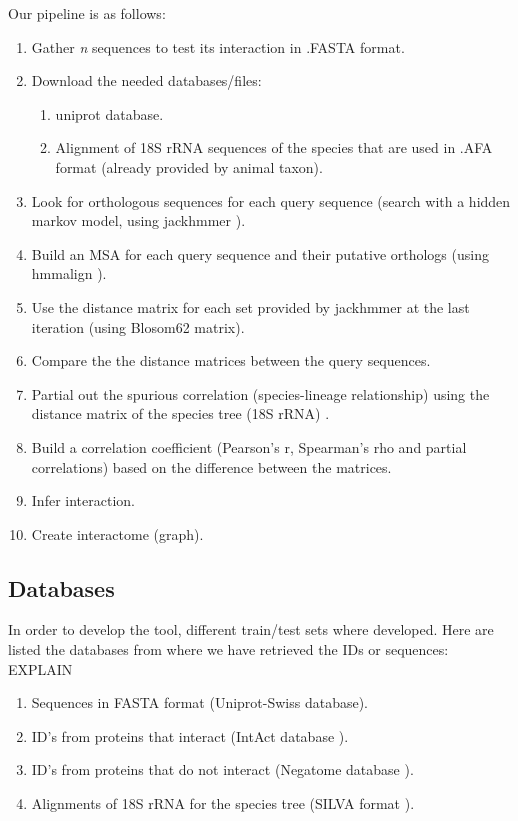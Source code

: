 \documentclass[11pt]{article}
\begin{document}
Our pipeline is as follows:
\begin{enumerate}
\setlength{\itemsep}{1pt}
	\item Gather \textit{n} sequences to test its interaction in .FASTA format.
	\item Download the needed databases/files:
	\begin{enumerate}
	\setlength{\itemsep}{1pt}
		\item uniprot database.
		\item Alignment of 18S rRNA sequences of the species that are used in .AFA format (already provided by animal taxon).
	\end{enumerate}
	\item Look for orthologous sequences for each query sequence (search with a hidden markov model, using jackhmmer \cite{HMMER}).
	\item Build an MSA for each query sequence and their putative orthologs (using hmmalign \cite{HMMER}).
	\item Use the distance matrix for each set provided by jackhmmer at the last iteration \cite{HMMER} (using Blosom62 matrix).
	\item Compare the the distance matrices between the query sequences.
	\item Partial out the spurious correlation (species-lineage relationship) using the distance matrix of the species tree (18S rRNA) \cite{Sato2005}.	
	\item Build a correlation coefficient (Pearson's r, Spearman's rho and partial correlations) based on the difference between the matrices.
	\item Infer interaction.
	\item Create interactome (graph).
\end{enumerate}

\subsection{Databases}
In order to develop the tool, different train/test sets where developed. Here are listed the databases from where we have retrieved the IDs or sequences: EXPLAIN
\begin{enumerate}
\setlength{\itemsep}{1pt}
	\item Sequences in FASTA format (Uniprot-Swiss database).
	\item ID's from proteins that interact (IntAct database \cite{intact}).
	\item ID's from proteins that do not interact (Negatome database \cite{negatome}).
	\item Alignments of 18S rRNA for the species tree (SILVA format \cite{SILVA}).
\end{enumerate}
\end{document}
